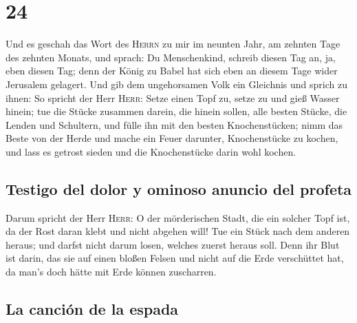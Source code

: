 \hypertarget{section-23}{%
\section{24}\label{section-23}}

 Und es geschah das Wort des \textsc{Herrn} zu mir im
neunten Jahr, am zehnten Tage des zehnten Monats, und sprach:
 Du Menschenkind, schreib diesen Tag an, ja, eben diesen
Tag; denn der König zu Babel hat sich eben an diesem Tage wider
Jerusalem gelagert.  Und gib dem ungehorsamen Volk ein
Gleichnis und sprich zu ihnen: So spricht der Herr \textsc{Herr}: Setze
einen Topf zu, setze zu und gieß Wasser hinein;  tue die
Stücke zusammen darein, die hinein sollen, alle besten Stücke, die
Lenden und Schultern, und fülle ihn mit den besten Knochenstücken;
 nimm das Beste von der Herde und mache ein Feuer
darunter, Knochenstücke zu kochen, und lass es getrost sieden und die
Knochenstücke darin wohl kochen.

\hypertarget{testigo-del-dolor-y-ominoso-anuncio-del-profeta}{%
\subsection{Testigo del dolor y ominoso anuncio del
profeta}\label{testigo-del-dolor-y-ominoso-anuncio-del-profeta}}

 Darum spricht der Herr \textsc{Herr}: O der mörderischen
Stadt, die ein solcher Topf ist, da der Rost daran klebt und nicht
abgehen will! Tue ein Stück nach dem anderen heraus; und darfst nicht
darum losen, welches zuerst heraus soll.  Denn ihr Blut
ist darin, das sie auf einen bloßen Felsen und nicht auf die Erde
verschüttet hat, da man's doch hätte mit Erde können zuscharren.

\hypertarget{la-canciuxf3n-de-la-espada}{%
\subsection{La canción de la espada}\label{la-canciuxf3n-de-la-espada}}

